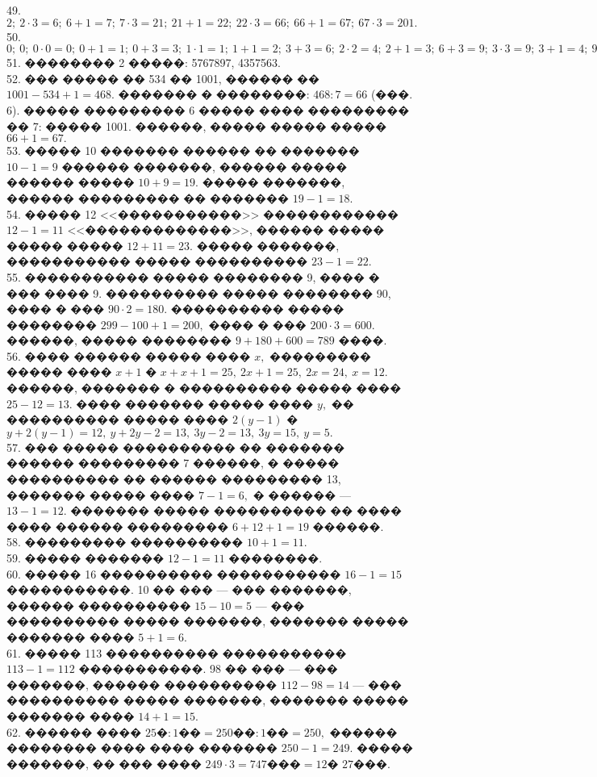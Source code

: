 \documentclass[12pt]{article}
\begin{document}
49. $2;\ 2\cdot3=6;\ 6+1=7;\ 7\cdot3=21;\ 21+1=22;\ 22\cdot3=66;\ 66+1=67;\ 67\cdot3=201.$\\
50. $0;\ 0;\ 0\cdot0=0;\ 0+1=1;\ 0+3=3;\ 1\cdot1=1;\ 1+1=2;\ 3+3=6;\ 2\cdot2=4;\ 2+1=3;\ 6+3=9;\ 3\cdot3=9;\ 3+1=4;\ 9+3=12;\ 4\cdot4=16;\ 4+1=5;\ 12+3=15;\ 5\cdot5=25.$\\
51. �������� 2 �����: 5767897, 4357563.\\
52. ��� ����� �� 534 �� 1001, ������ �� $1001-534+1=468.$ ������� � ��������: $468:7=66$ (���. 6). ����� ��������� 6 ����� ���� ��������� �� 7: ����� 1001. ������, ����� ����� ����� $66+1=67.$\\
53. ����� 10 ������� ������ �� ������� $10-1=9$ ������ �������, ������ ����� ������ ����� $10+9=19.$ ����� �������, ������ ��������� �� ������� $19-1=18.$\\
54. ����� 12 <<�����������>> ������������ $12-1=11$ <<�������������>>, ������ ����� ����� ����� $12+11=23.$ ����� �������, ����������� ����� ���������� $23-1=22.$\\
55. ����������� ����� �������� 9, ���� � ��� ���� 9. ���������� ����� �������� 90, ���� � ��� $90\cdot2=180.$ ���������� ����� �������� $299-100+1=200,$ ���� � ��� $200\cdot3=600.$ ������, ����� �������� $9+180+600=789$ ����.\\
56. ���� ������ ����� ���� $x,$ ��������� ����� ���� $x+1$ � $x+x+1=25,\ 2x+1=25,\ 2x=24,\ x=12.$ ������, ������� � ���������� ����� ���� $25-12=13.$ ���� ������� ����� ���� $y,$ �� ���������� ����� ���� $2(y-1)$ � $y+2(y-1)=12,\ y+2y-2=13,\ 3y-2=13,\ 3y=15,\ y=5.$\\
57. ��� ����� ���������� �� ������� ������ ��������� 7 ������, � ����� ���������� �� ������ ��������� 13, ������� ����� ���� $7-1=6,$ � ������ --- $13-1=12.$ ������� ����� ���������� �� ���� ���� ������ ��������� $6+12+1=19$ ������.\\
58. ��������� ���������� $10+1=11.$\\
59. ����� ������� $12-1=11$ ��������.\\
60. ����� 16 ���������� ����������� $16-1=15$ �����������. 10 �� ��� --- ��� �������, ������ ���������� $15-10=5$ --- ��� ���������� ����� �������, ������� ����� ������� ���� $5+1=6.$\\
61. ����� 113 ���������� ����������� $113-1=112$ �����������. 98 �� ��� --- ��� �������, ������ ���������� $112-98=14$ --- ��� ���������� ����� �������, ������� ����� ������� ���� $14+1=15.$\\
62. ������ ���� $25\text{�}:1\text{��}=250\text{��}:1\text{��}=250,$ ������ �������� ���� ���� ������� $250-1=249.$ ����� �������, �� ��� ���� $249\cdot3=747\text{���}=12\text{� }27\text{���}.$\\
\end{document}
